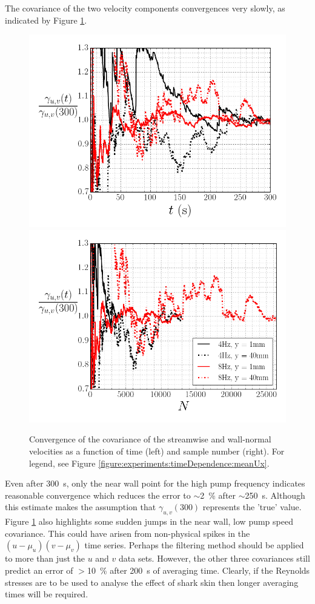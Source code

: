 \documentclass[12pt,oneside,a4paper]{article}
\begin{document}
The covariance of the two velocity components convergences very slowly, as indicated by Figure \ref{figure:experiments:timeDependence:uv}.
%
\begin{figure}[!h]
\centering
\includegraphics[width=0.5\linewidth]{images/LDA_timeDependenceImages/uvTConvergence.png}\hfill
\includegraphics[width=0.5\linewidth]{images/LDA_timeDependenceImages/uvNConvergence.png}\\
\caption{Convergence of the covariance of the streamwise and wall-normal velocities as a function of time (left) and sample number (right). For legend, see Figure \ref{figure:experiments:timeDependence:meanUx}.}
\label{figure:experiments:timeDependence:uv}
\end{figure}
%
Even after \SI{300}{s}, only the near wall point for the high pump frequency indicates reasonable convergence which reduces the error to $\sim$\SI{2}{\%} after $\sim$\SI{250}{s}. Although this estimate makes the assumption that $\gamma_{u,v}(300)$ represents the 'true' value. Figure \ref{figure:experiments:timeDependence:uv} also highlights some sudden jumps in the near wall, low pump speed covariance. This could have arisen from non-physical spikes in the $(u-\mu_u)(v-\mu_v)$ time series. Perhaps the filtering method should be applied to more than just the $u$ and $v$ data sets. However, the other three covariances still predict an error of $>$\SI{10}{\%} after \SI{200}{s} of averaging time. Clearly, if the Reynolds stresses are to be used to analyse the effect of shark skin then longer averaging times will be required. 
\end{document}
